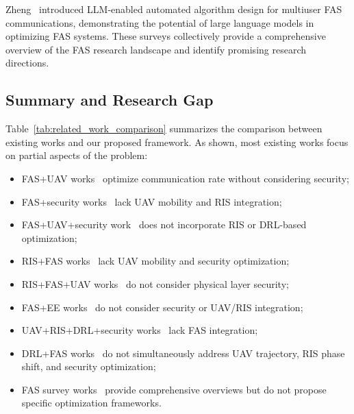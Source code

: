Zheng~\cite{zheng2026llm} introduced LLM-enabled automated algorithm design for multiuser FAS communications, demonstrating the potential of large language models in optimizing FAS systems. These surveys collectively provide a comprehensive overview of the FAS research landscape and identify promising research directions.

\subsection{Summary and Research Gap}

Table~\ref{tab:related_work_comparison} summarizes the comparison between existing works and our proposed framework. As shown, most existing works focus on partial aspects of the problem:
\begin{itemize}
    \item FAS+UAV works~\cite{reda2026uav, zhu2026uav, zhang2026uav, liu2026uav, liu2025rate, zhang2026radiation, siyun2025fair} optimize communication rate without considering security;
    \item FAS+security works~\cite{wu2024fasris, ghadi2024ris, yao2024fas, mai2024noma, wu2025variable, zheng2026pls, ghadi2026efas, li2025fas, si2024reliable} lack UAV mobility and RIS integration;
    \item FAS+UAV+security work~\cite{wu2025faaav} does not incorporate RIS or DRL-based optimization;
    \item RIS+FAS works~\cite{chen2025hybrid, zhang2025ris, li2026absorptive, shi2026star, chen2024lowcomplexity, li2024performance, wang2025novel, li2026swipt, zhao2026rician, mondal2026v2v, zhu2025fa, mondal2026ris} lack UAV mobility and security optimization;
    \item RIS+FAS+UAV works~\cite{shen2025ris, yang2026federated} do not consider physical layer security;
    \item FAS+EE works~\cite{ahmad2025energy, bithas2025dependability} do not consider security or UAV/RIS integration;
    \item UAV+RIS+DRL+security works~\cite{hashempour2026robust} lack FAS integration;
    \item DRL+FAS works~\cite{yang2025intelligent, peng2026grpo, ju2025joint, pakravan2026hybrid, shen2026mf, chen2026adaptive, xu2025transformer, zhang2026indoor} do not simultaneously address UAV trajectory, RIS phase shift, and security optimization;
    \item FAS survey works~\cite{zhang2023flexible, xu2025survey, pakravan2026survey, akyildiz2026fas, zheng2026llm} provide comprehensive overviews but do not propose specific optimization frameworks.
\end{itemize}

